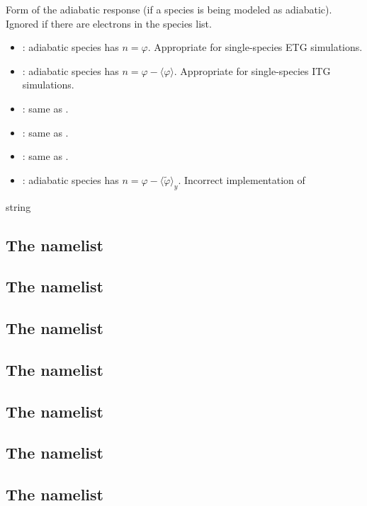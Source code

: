 {Form of the adiabatic response (if a species is being modeled as adiabatic). 
  Ignored if there are electrons in the species list.}
{\begin{itemize}
  \item {}: adiabatic species has $n=\varphi$. 
    Appropriate for single-species ETG simulations.
  \item {}: adiabatic species has $n=\varphi-\langle\varphi\rangle$. 
    Appropriate for single-species ITG simulations.
  \item {}: same as .
  \item {}: same as .
  \item {}: same as .
  \item {}: adiabatic species has $n=\varphi-\langle\tilde{\varphi}\rangle_y$.
    Incorrect implementation of 
  \end{itemize}
}
{string}{}

\subsection{The   namelist}
\subsection{The   namelist}
\subsection{The   namelist}
\subsection{The   namelist}
\subsection{The   namelist}
\subsection{The  namelist}
\subsection{The  namelist}

